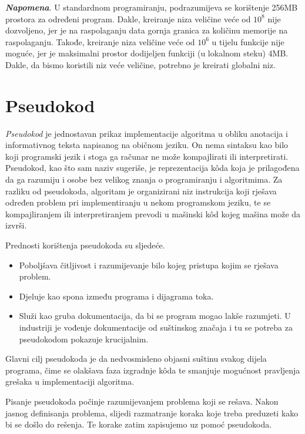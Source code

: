  
  \textbf{\textit{Napomena}}. U standardnom programiranju, podrazumijeva se korištenje 256MB prostora za određeni program. Dakle, kreiranje   niza veličine veće od $10^8$ nije dozvoljeno, jer je na raspolaganju data gornja granica za količinu memorije na  raspolaganju. Takođe, kreiranje  niza veličine veće od $10^6$ u tijelu funkcije nije moguće, jer je maksimalni prostor dodijeljen funkciji (u lokalnom steku) 4MB. Dakle, da bismo koristili niz veće veličine, potrebno je kreirati globalni niz.

\section{Pseudokod}

\textit{Pseudokod} je jednostavan prikaz implementacije algoritma u obliku anotacija i informativnog teksta napisanog na običnom jeziku. On nema sintaksu kao bilo koji programski jezik i stoga ga računar ne može kompajlirati ili interpretirati. %
 Pseudokod, kao što sam naziv sugeriše, je reprezentacija k\^oda koja je prilagođena da ga razumiju i osobe bez velikog znanja o programiranju i algoritmima. Za razliku od pseudokoda, algoritam je organizirani   niz instrukcija koji rješava određen problem pri implementiranju u nekom programskom jeziku, te se kompajliranjem  ili interpretiranjem prevodi u mašinski k\^od kojeg mašina može da izvrši.

Prednosti korištenja pseudokoda su sljedeće. 
\begin{itemize}
	\item Poboljšava čitljivost i razumijevanje bilo kojeg pristupa kojim se rješava problem.
	\item Djeluje kao spona između programa i dijagrama toka.
	\item Služi kao gruba dokumentacija, da bi se program mogao lakše razumjeti. U industriji je vođenje dokumentacije od suštinskog značaja i tu se potreba za pseudokodom pokazuje krucijalnim.
\end{itemize}
 
 
Glavni cilj pseudokoda je da nedvosmisleno objasni suštinu svakog dijela programa, čime se olakšava faza izgradnje k\^oda te smanjuje mogućnost pravljenja  grešaka u implementaciji algoritma.

Pisanje pseudokoda počinje razumijevanjem problema koji se rešava. Nakon  jasnog definisanja problema, slijedi razmatranje koraka koje treba preduzeti kako bi se došlo do rešenja. Te korake zatim zapisujemo uz pomoć  pseudokoda.

